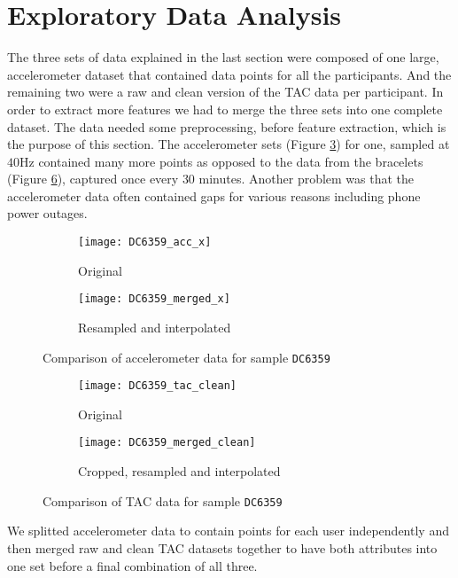\section{Exploratory Data Analysis}
The three sets of data explained in the last section were composed of one large, accelerometer dataset that contained data points for all the participants.
And the remaining two were a raw and clean version of the TAC data per participant.
In order to extract more features we had to merge the three sets into one complete dataset.
The data needed some preprocessing, before feature extraction, which is the purpose of this section.
The accelerometer sets (Figure \ref{fig:acc-comp}) for one, sampled at $40 \si{\hertz}$ contained many more points as opposed to the data from the bracelets (Figure \ref{fig:tac-comp}), captured once every $30$ minutes.
Another problem was that the accelerometer data often contained gaps for various reasons including phone power outages.
\begin{figure}[h]
	\begin{subfigure}[c]{0.49\columnwidth}
		\centering
		\texttt{[image: DC6359\_acc\_x]}
		\caption{Original}
		\label{fig:acc-orig}		
	\end{subfigure}\hfill%
	\begin{subfigure}[c]{0.49\columnwidth}
		\centering
		\texttt{[image: DC6359\_merged\_x]}
		\caption{Resampled and interpolated}
		\label{fig:acc-intpl}
	\end{subfigure}
	\caption{Comparison of accelerometer data for sample \texttt{DC6359}}
	\label{fig:acc-comp}
\end{figure}
\begin{figure}[h]
	\begin{subfigure}[c]{0.49\columnwidth}
		\centering
		\texttt{[image: DC6359\_tac\_clean]}
		\caption{Original}
		\label{fig:tac-orig}		
	\end{subfigure}\hfill%
	\begin{subfigure}[c]{0.49\columnwidth}
		\centering
		\texttt{[image: DC6359\_merged\_clean]}
		\caption{Cropped, resampled and interpolated}
		\label{fig:tac-intpl}
	\end{subfigure}
	\caption{Comparison of TAC data for sample \texttt{DC6359}}
	\label{fig:tac-comp}
\end{figure}
We splitted accelerometer data to contain points for each user independently and then merged raw and clean TAC datasets together to have both attributes into one set before a final combination of all three.
